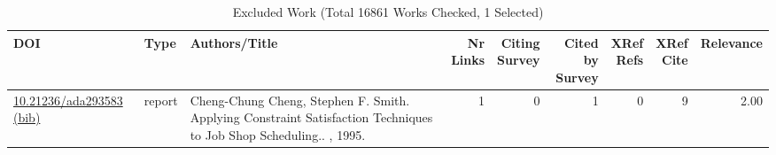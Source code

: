 {\scriptsize
\begin{longtable}{p{5cm}lp{11cm}rrrrrr}
\caption{Excluded Work (Total 16861 Works Checked, 1 Selected)}\\ \toprule
DOI & Type & Authors/Title & \shortstack{Nr\\Links} & \shortstack{Citing\\Survey} & \shortstack{Cited by\\Survey} & \shortstack{XRef\\Refs} & \shortstack{XRef\\Cite} & Relevance\\ \midrule\endhead
\bottomrule
\endfoot
\href{http://dx.doi.org/10.21236/ada293583}{10.21236/ada293583} \href{https://www.doi2bib.org/bib/10.21236/ada293583}{(bib)} & report & Cheng-Chung Cheng, Stephen F. Smith. Applying Constraint Satisfaction Techniques to Job Shop Scheduling.. , 1995. & 1 & 0 & 1 & 0 & 9 &  2.00\\
\end{longtable}
}

